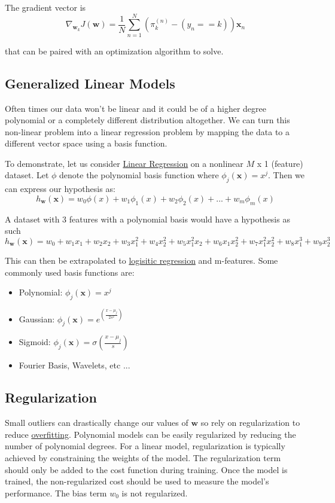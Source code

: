 \documentclass[12pt]{article}
\begin{document}
            The gradient vector is
            $$ \nabla_{\boldsymbol{w}_k} J(\boldsymbol{w}) = \frac{1}{N}\sum_{n=1}^N(\pi^{(n)}_k - (y_n ==
            k))\boldsymbol{x}_n $$

            that can be paired with an optimization algorithm to solve.

    \subsection{Generalized Linear Models}
        Often times our data won't be linear and it could be of a higher degree polynomial or a completely different
        distribution altogether. We can turn this non-linear problem into a linear regression problem by mapping the
        data to a different vector space using a basis function.

        To demonstrate, let us consider \hyperref[sec:LinearRegression]{Linear Regression} on a nonlinear $M$ x 1
        (feature) dataset. Let $\phi$ denote the polynomial basis function where $\phi_j(\boldsymbol{x}) = x^j$. Then we
        can express our hypothesis as: 
        $$ h_{\boldsymbol{w}}(\boldsymbol{x}) = w_0\phi(x) + w_1\phi_1(x) + w_2\phi_2(x) + ... + w_m\phi_m(x) $$

        A dataset with 3 features with a polynomial basis would have a hypothesis as such
        $$ h_{\boldsymbol{w}}(\boldsymbol{x}) = w_0 + w_1x_1 + w_2x_2 + w_3x_1^2 + w_4x_2^2 + w_5x_1^2x_2 + w_6x_1x_2^2
        + w_7x_1^2x_2^2 + w_8x_1^3 + w_9x_2^3 $$

        This can then be extrapolated to \hyperref[sec:LogisticRegression]{logisitic regression} and m-features. Some
        commonly used basis functions are:

        \begin{itemize}
            \item Polynomial: $\phi_j(\boldsymbol{x}) = x^j$
            \item Gaussian: $\phi_j(\boldsymbol{x}) = e^{(\frac{x-\mu_j}{2s^2})}$
            \item Sigmoid: $\phi_j(\boldsymbol{x}) = \sigma{(\frac{x-\mu_j}{s})}$
            \item Fourier Basis, Wavelets, etc ...
        \end{itemize}

    \subsection{Regularization} \label{sec:Regularization}
        Small outliers can drastically change our values of $\boldsymbol{w}$ so rely on regularization to reduce
        \hyperref[sec:Overfitting]{overfitting}. Polynomial models can be easily regularized by reducing the number of
        polynomial degrees. For a linear model, regularization is typically achieved by constraining the weights of the
        model. The regularization term should only be added to the cost function during training. Once the model is
        trained, the non-regularized cost should be used to measure the model's performance. The bias term $w_0$ is not
        regularized.
\end{document}
